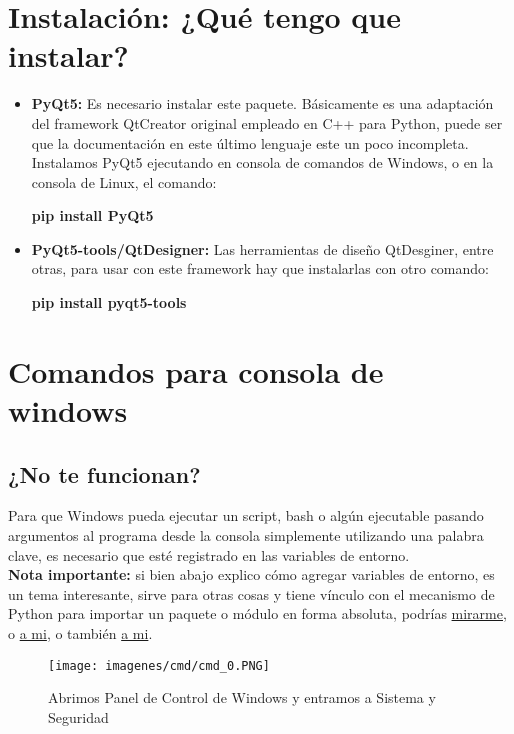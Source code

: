 \section{Instalaci\'on: ¿Qu\'e tengo que instalar?}
\begin{itemize}
    \item \textbf{PyQt5:} Es necesario instalar este paquete. B\'asicamente es una adaptaci\'on del framework QtCreator original empleado en C++ para Python, puede ser que la documentaci\'on en este \'ultimo lenguaje este un poco incompleta.
    Instalamos PyQt5 ejecutando en consola de comandos de Windows, o en la consola de Linux, el comando:
    \begin{center}
        \textbf{pip install PyQt5}
    \end{center}

    \item \textbf{PyQt5-tools/QtDesigner:} Las herramientas de dise\~no QtDesginer, entre otras, para usar con este framework hay que instalarlas con otro comando:
    \begin{center}
        \textbf{pip install pyqt5-tools}
    \end{center}
\end{itemize}

\section{Comandos para consola de windows}

\subsection{¿No te funcionan?}
\label{error_de_consola}
Para que Windows pueda ejecutar un script, bash o alg\'un ejecutable pasando argumentos al programa desde la consola simplemente utilizando una palabra clave, es necesario
que est\'e registrado en las variables de entorno. 
\\
\textbf{Nota importante:} si bien abajo explico c\'omo agregar variables de entorno, es un tema interesante, sirve para otras cosas y tiene v\'inculo con el mecanismo de Python
para importar un paquete o m\'odulo en forma absoluta, podr\'ias \href{https://rootear.com/windows/variable-entorno-windows}{mirarme}, o \href{https://es.ccm.net/contents/652-variables-de-entorno}{a mi}, o tambi\'en \href{https://norfipc.com/inf/variables-entorno.html}{a mi}.


\begin{figure}[H]
    \centering
    \texttt{[image: imagenes/cmd/cmd\_0.PNG]}
    \caption{Abrimos Panel de Control de Windows y entramos a Sistema y Seguridad}
\end{figure}

